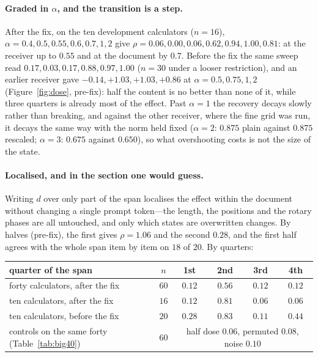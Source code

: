 \documentclass{article}
\newcommand{\dvec}{\ensuremath{d}}
\begin{document}
\paragraph{Graded in $\alpha$, and the transition is a step.} After the fix,
on the ten development calculators ($n=16$), $\alpha = 0.4, 0.5, 0.55, 0.6, 0.7,
1, 2$ give $\rho = 0.06, 0.00, 0.06, 0.62, 0.94, 1.00, 0.81$: at the receiver up
to $0.55$ and at the document by $0.7$. Before the fix the same sweep read
$0.17, 0.03, 0.17, 0.88, 0.97, 1.00$ ($n=30$ under a looser restriction), and an
earlier receiver gave $-0.14, +1.03, +1.03, +0.86$ at $\alpha = 0.5, 0.75, 1, 2$
(Figure~\ref{fig:dose}, pre-fix): half the content is no better than none of
it, while three quarters is already most of the effect. Past $\alpha=1$ the
recovery decays slowly rather than breaking, and against the other receiver,
where the fine grid was run, it decays the same way with the norm held fixed
($\alpha=2$: $0.875$ plain against $0.875$ rescaled; $\alpha=3$: $0.675$ against
$0.650$), so what overshooting costs is not the size of the state.

\paragraph{Localised, and in the section one would guess.} Writing $\dvec$ over
only part of the span localises the effect within the document without changing
a single prompt token---the length, the positions and the rotary phases are all
untouched, and only which states are overwritten changes. By halves (pre-fix),
the first gives $\rho = 1.06$ and the second $0.28$, and the first half agrees
with the whole span item by item on $18$ of $20$. By quarters:
\begin{center}
\begin{tabular}{@{}lccccc@{}}
\toprule
quarter of the span & $n$ & 1st & \textbf{2nd} & 3rd & 4th \\
\midrule
forty calculators, after the fix & $60$ & $0.12$ & $\mathbf{0.56}$ & $0.12$ & $0.12$ \\
ten calculators, after the fix & $16$ & $0.12$ & $\mathbf{0.81}$ & $0.06$ & $0.06$ \\
ten calculators, before the fix & $20$ & $0.28$ & $\mathbf{0.83}$ & $0.11$ & $0.44$ \\
\midrule
controls on the same forty (Table~\ref{tab:big40}) & $60$ & \multicolumn{4}{c}{half dose $0.06$, permuted $0.08$, noise $0.10$} \\
\bottomrule
\end{tabular}
\end{center}
\end{document}
